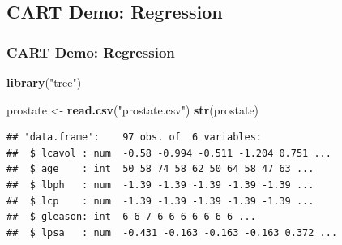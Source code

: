 \documentclass[
  shownotes,
  xcolor={svgnames},
  hyperref={colorlinks,citecolor=DarkBlue,linkcolor=DarkRed,urlcolor=DarkBlue}
  , aspectratio=169]{beamer}
\newenvironment{Shaded}{\begin{snugshade}}{\end{snugshade}}
\newcommand{\KeywordTok}[1]{\textcolor[rgb]{0.13,0.29,0.53}{\textbf{#1}}}
\newcommand{\NormalTok}[1]{#1}
\newcommand{\StringTok}[1]{\textcolor[rgb]{0.31,0.60,0.02}{#1}}
\begin{document}
\subsection{CART Demo: Regression}
\begin{frame}[fragile]
\frametitle{CART Demo: Regression}

\begin{tiny}
\begin{Shaded}
\begin{Highlighting}[]
\KeywordTok{library}\NormalTok{(}\StringTok{"tree"}\NormalTok{)}

\NormalTok{prostate \textless{}{-}}\StringTok{ }\KeywordTok{read.csv}\NormalTok{(}\StringTok{"prostate.csv"}\NormalTok{)}
\KeywordTok{str}\NormalTok{(prostate)}
\end{Highlighting}
\end{Shaded}
\end{tiny}

\begin{tiny}
\begin{verbatim}
## 'data.frame':    97 obs. of  6 variables:
##  $ lcavol : num  -0.58 -0.994 -0.511 -1.204 0.751 ...
##  $ age    : int  50 58 74 58 62 50 64 58 47 63 ...
##  $ lbph   : num  -1.39 -1.39 -1.39 -1.39 -1.39 ...
##  $ lcp    : num  -1.39 -1.39 -1.39 -1.39 -1.39 ...
##  $ gleason: int  6 6 7 6 6 6 6 6 6 6 ...
##  $ lpsa   : num  -0.431 -0.163 -0.163 -0.163 0.372 ...
\end{verbatim}
\end{tiny}

\end{frame}
\end{document}

